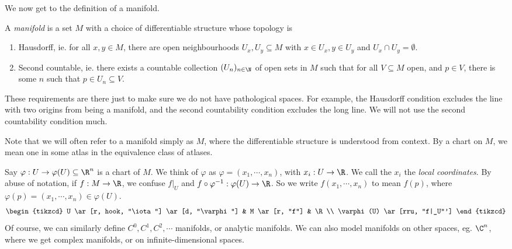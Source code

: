 \documentclass[a4paper]{article}
\begin{document}
We now get to the definition of a manifold.

\begin{defi}[Manifold]
  A \emph{manifold} is a set $M$ with a choice of differentiable structure whose topology is
  \begin{enumerate}
    \item Hausdorff, ie. for all $x, y \in M$, there are open neighbourhoods $U_x, U_y \subseteq M$ with $x \in U_x, y \in U_y$ and $U_x \cap U_y = \emptyset$.
    \item Second countable, ie. there exists a countable collection $(U_n)_{n \in \N}$ of open sets in $M$ such that for all $V \subseteq M$ open, and $p \in V$, there is some $n$ such that $p \in U_n \subseteq V$.
  \end{enumerate}
\end{defi}
These requirements are there just to make sure we do not have pathological spaces. For example, the Hausdorff condition excludes the line with two origins from being a manifold, and the second countability condition excludes the long line. We will not use the second countability condition much.

Note that we will often refer to a manifold simply as $M$, where the differentiable structure is understood from context. By a chart on $M$, we mean one in some atlas in the equivalence class of atlases.

Say $\varphi: U \to \varphi(U) \subseteq \R^n$ is a chart of $M$. We think of $\varphi$ as $\varphi = (x_1, \cdots, x_n)$, with $x_i: U \to \R$. We call the $x_i$ the \emph{local coordinates}. By abuse of notation, if $f: M \to \R$, we confuse $f|_U$ and $f \circ \varphi^{-1}: \varphi(U) \to \R$. So we write $f(x_1, \cdots, x_n)$ to mean $f(p)$, where $\varphi(p) = (x_1, \cdots, x_n) \in \varphi(U)$.
\[
  \begin{tikzcd}
    U \ar[r, hook, "\iota"] \ar[d, "\varphi"] & M \ar[r, "f"] & \R\\
    \varphi(U) \ar[rru, "f|_U"']
  \end{tikzcd}
\]
Of course, we can similarly define $C^0, C^1, C^2, \cdots$ manifolds, or analytic manifolds. We can also model manifolds on other spaces, eg. $\C^n$, where we get complex manifolds, or on infinite-dimensional spaces.
\end{document}
